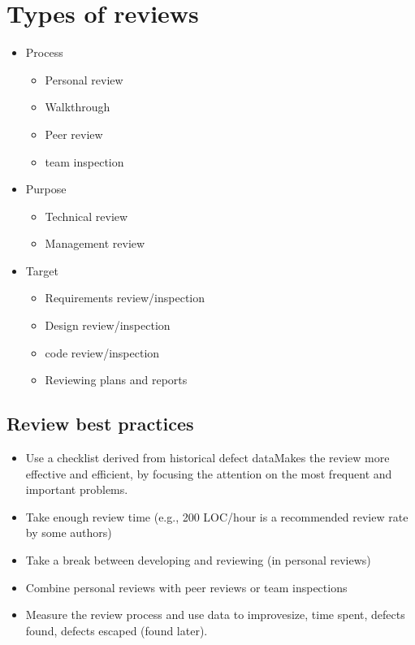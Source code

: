 \documentclass[../ESOF_notes.tex]{subfiles}
\begin{document}
\section{Types of reviews}
    \begin{itemize}
        \item Process
        \begin{itemize}
            \item Personal review
            \item Walkthrough
            \item Peer review
            \item team inspection
        \end{itemize}
        \item Purpose
        \begin{itemize}
            \item Technical review
            \item Management review
        \end{itemize}   
        \item Target
        \begin{itemize}
            \item Requirements review/inspection
            \item Design review/inspection
            \item code review/inspection
            \item Reviewing plans and reports
        \end{itemize}   
    \end{itemize}
    
    \subsection{Review best practices}
    \begin{itemize}
        \item Use a checklist derived from historical defect data\newline Makes the review more effective and efficient, by focusing the attention on the most frequent and important problems.
        \item Take enough review time (e.g., 200 LOC/hour is a recommended review rate by some authors)
        \item Take a break between developing and reviewing (in personal reviews)
        \item Combine personal reviews with peer reviews or team inspections
        \item Measure the review process and use data to improve\newline size, time spent, defects found, defects escaped (found later).
    \end{itemize}
    
\end{document}
